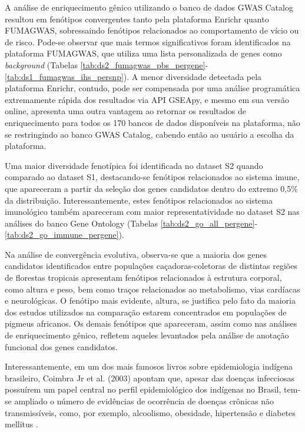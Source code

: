 A análise de enriquecimento gênico utilizando o banco de dados GWAS Catalog resultou em fenótipos convergentes tanto pela plataforma Enrichr quanto FUMAGWAS, sobressaindo fenótipos relacionados ao comportamento de vício ou de risco. Pode-se observar que mais termos significativos foram identificados na plataforma FUMAGWAS, que utiliza uma lista personalizada de genes como \textit{background} (Tabelas \ref{tab:ds2_fumagwas_pbs_pergene}-\ref{tab:ds1_fumagwas_ihs_persnp}). A menor diversidade detectada pela plataforma Enrichr, contudo, pode ser compensada por uma análise programática extremamente rápida dos resultados via API GSEApy, e mesmo em sua versão online, apresenta uma outra vantagem ao retornar os resultados de enriquecimento para todos os 170 bancos de dados disponíveis na plataforma, não se restringindo ao banco GWAS Catalog, cabendo então ao usuário a escolha da plataforma.

Uma maior diversidade fenotípica foi identificada no dataset S2 quando comparado ao dataset S1, destacando-se fenótipos relacionados ao sistema imune, que apareceram a partir da seleção dos genes candidatos dentro do extremo 0,5\% da distribuição. Interessantemente, estes fenótipos relacionados ao sistema imunológico também apareceram com maior representatividade no dataset S2 nas análises do banco Gene Ontology (Tabelas \ref{tab:ds2_go_all_pergene}-\ref{tab:ds2_go_immune_pergene}). 

Na análise de convergência evolutiva, observa-se que a maioria dos genes candidatos identificados entre populações caçadoras-coletoras de distintas regiões de florestas tropicais apresentam fenótipos relacionados à estrutura corporal, como altura e peso, bem como traços relacionados ao metabolismo, vias cardíacas e neurológicas. O fenótipo mais evidente, altura, se justifica pelo fato da maioria dos estudos utilizados na comparação estarem concentrados em populações de pigmeus africanos. Os demais fenótipos que apareceram, assim como nas análises de enriquecimento gênico, refletem aqueles levantados pela análise de anotação funcional dos genes candidatos.

Interessantemente, em um dos mais famosos livros sobre epidemiologia indígena brasileiro, Coimbra Jr et al. (2003) apontam que, apesar das doenças infecciosas possuírem um papel central no perfil epidemiológico dos indígenas no Brasil, tem-se ampliado o número de evidências de ocorrência de doenças crônicas não transmissíveis, como, por exemplo, alcoolismo, obesidade, hipertensão  e diabetes mellitus \cite{coimbra_jr_epidemiologia_2003,guimaraes_alcoolismo_2007}.

